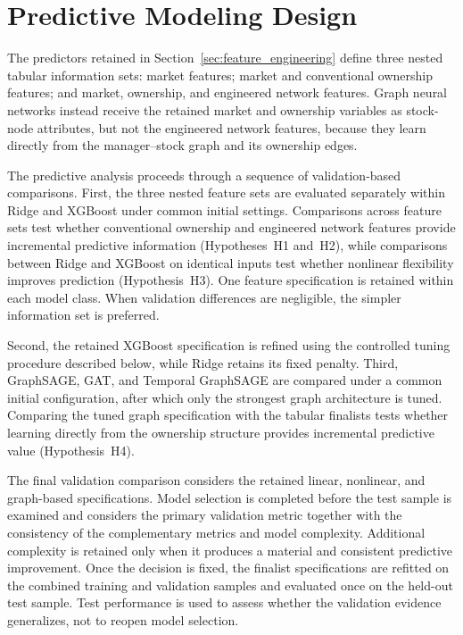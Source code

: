 \section{Predictive Modeling Design}
\label{sec:modeling_design}

The predictors retained in Section~\ref{sec:feature_engineering} define three nested tabular information sets: market features; market and conventional ownership features; and market, ownership, and engineered network features. Graph neural networks instead receive the retained market and ownership variables as stock-node attributes, but not the engineered network features, because they learn directly from the manager--stock graph and its ownership edges.

The predictive analysis proceeds through a sequence of validation-based comparisons. First, the three nested feature sets are evaluated separately within Ridge and XGBoost under common initial settings. Comparisons across feature sets test whether conventional ownership and engineered network features provide incremental predictive information (Hypotheses~H1 and~H2), while comparisons between Ridge and XGBoost on identical inputs test whether nonlinear flexibility improves prediction (Hypothesis~H3). One feature specification is retained within each model class. When validation differences are negligible, the simpler information set is preferred.

Second, the retained XGBoost specification is refined using the controlled tuning procedure described below, while Ridge retains its fixed penalty. Third, GraphSAGE, GAT, and Temporal GraphSAGE are compared under a common initial configuration, after which only the strongest graph architecture is tuned. Comparing the tuned graph specification with the tabular finalists tests whether learning directly from the ownership structure provides incremental predictive value (Hypothesis~H4).

The final validation comparison considers the retained linear, nonlinear, and graph-based specifications. Model selection is completed before the test sample is examined and considers the primary validation metric together with the consistency of the complementary metrics and model complexity. Additional complexity is retained only when it produces a material and consistent predictive improvement. Once the decision is fixed, the finalist specifications are refitted on the combined training and validation samples and evaluated once on the held-out test sample. Test performance is used to assess whether the validation evidence generalizes, not to reopen model selection.

